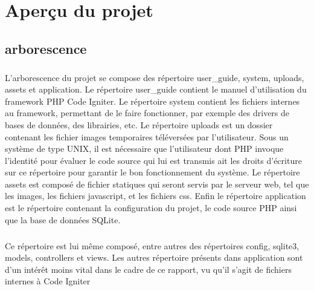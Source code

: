 \chapter{Aperçu du projet}
\section{arborescence}
    \paragraph{}
        L'arborescence du projet se compose des répertoire user\_guide, system,
        uploads, assets et application.
        Le répertoire user\_guide contient le manuel d'utilisation du framework
        PHP Code Igniter.
        Le répertoire system contient les fichiers internes au framework,
        permettant de le faire fonctionner, par exemple des drivers de bases
        de données, des librairies, etc.
        Le répertoire uploads est un dossier contenant les fichier images
        temporaires téléversées par l'utilisateur.
        Sous un système de type UNIX, il est nécessaire que l'utilisateur dont
        PHP invoque l'identité pour évaluer le code source qui lui est
        transmis ait les droits d'écriture sur ce répertoire pour garantir le
        bon fonctionnement du système.
        Le répertoire assets est composé de fichier statiques qui seront 
        servis par le serveur web, tel que les images, les fichiers javascript,
        et les fichiers css.
        Enfin le répertoire application est le répertoire contenant la
        configuration du projet, le code source PHP ainsi que la base de
        données SQLite.

    \paragraph{}
        Ce répertoire est lui même composé, entre autres des répertoires 
        config, sqlite3, models, controllers et views.
        Les autres répertoire présents dans application sont d'un intérêt moins
        vital dans le cadre de ce rapport, vu qu'il s'agit de fichiers internes
        à Code Igniter

